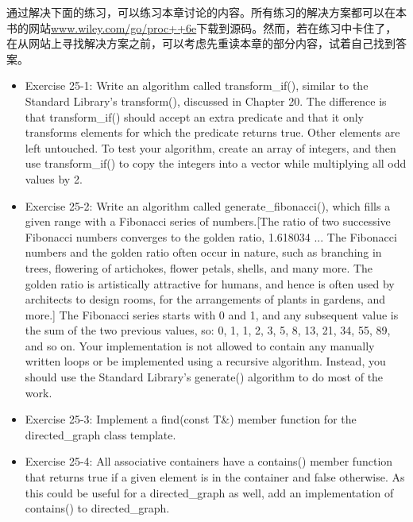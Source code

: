通过解决下面的练习，可以练习本章讨论的内容。所有练习的解决方案都可以在本书的网站\url{www.wiley.com/go/proc++6e}下载到源码。然而，若在练习中卡住了，在从网站上寻找解决方案之前，可以考虑先重读本章的部分内容，试着自己找到答案。

\begin{itemize}
\item
Exercise 25-1: Write an algorithm called transform\_if(), similar to the Standard Library’s transform(), discussed in Chapter 20. The difference is that transform\_if() should accept an extra predicate and that it only transforms elements for which the predicate returns true. Other elements are left untouched. To test your algorithm, create an array of integers, and then use transform\_if() to copy the integers into a vector while multiplying all odd values by 2.

\item
Exercise 25-2: Write an algorithm called generate\_fibonacci(), which fills a given range with a Fibonacci series of numbers.[The ratio of two successive Fibonacci numbers converges to the golden ratio, 1.618034 ... The Fibonacci numbers and the golden ratio often occur in nature, such as branching in trees, flowering of artichokes, flower petals, shells, and many more. The golden ratio is artistically attractive for humans, and hence is often used by architects to design rooms, for the arrangements of plants in gardens, and more.] The Fibonacci series starts with 0 and 1, and any subsequent value is the sum of the two previous values, so: 0, 1, 1, 2, 3, 5, 8, 13, 21, 34, 55, 89, and so on. Your implementation is not allowed to contain any manually written loops or be implemented using a recursive algorithm. Instead, you should use the Standard Library’s generate() algorithm to do most of the work.

\item
Exercise 25-3: Implement a find(const T\&) member function for the directed\_graph class template.

\item
Exercise 25-4: All associative containers have a contains() member function that returns true if a given element is in the container and false otherwise. As this could be useful for a directed\_graph as well, add an implementation of contains() to directed\_graph.
\end{itemize}











